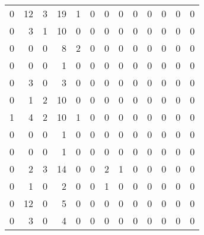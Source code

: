 \begin{tabular}{rrrrrrrrrrrrr}
       0 &      12 &          3 &              19 &                1 &       0 &          0 &          0 &         0 &         0 &      0 &             0 &         0 \\
       0 &       3 &          1 &              10 &                0 &       0 &          0 &          0 &         0 &         0 &      0 &             0 &         0 \\
       0 &       0 &          0 &               8 &                2 &       0 &          0 &          0 &         0 &         0 &      0 &             0 &         0 \\
       0 &       0 &          0 &               1 &                0 &       0 &          0 &          0 &         0 &         0 &      0 &             0 &         0 \\
       0 &       3 &          0 &               3 &                0 &       0 &          0 &          0 &         0 &         0 &      0 &             0 &         0 \\
       0 &       1 &          2 &              10 &                0 &       0 &          0 &          0 &         0 &         0 &      0 &             0 &         0 \\
       1 &       4 &          2 &              10 &                1 &       0 &          0 &          0 &         0 &         0 &      0 &             0 &         0 \\
       0 &       0 &          0 &               1 &                0 &       0 &          0 &          0 &         0 &         0 &      0 &             0 &         0 \\
       0 &       0 &          0 &               1 &                0 &       0 &          0 &          0 &         0 &         0 &      0 &             0 &         0 \\
       0 &       2 &          3 &              14 &                0 &       0 &          2 &          1 &         0 &         0 &      0 &             0 &         0 \\
       0 &       1 &          0 &               2 &                0 &       0 &          1 &          0 &         0 &         0 &      0 &             0 &         0 \\
       0 &      12 &          0 &               5 &                0 &       0 &          0 &          0 &         0 &         0 &      0 &             0 &         0 \\
       0 &       3 &          0 &               4 &                0 &       0 &          0 &          0 &         0 &         0 &      0 &             0 &         0 \\

\end{tabular}
